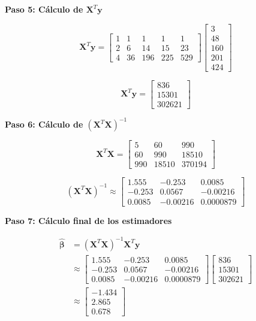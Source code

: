 \documentclass[11pt,a4paper]{article}
\begin{document}
\textbf{Paso 5: Cálculo de $\mathbf{X}^T\mathbf{y}$}

\[
\mathbf{X}^T\mathbf{y} = \begin{bmatrix}
    1 & 1 & 1 & 1 & 1 \\
    2 & 6 & 14 & 15 & 23 \\
    4 & 36 & 196 & 225 & 529
\end{bmatrix}
\begin{bmatrix}
    3 \\
    48 \\
    160 \\
    201 \\
    424
\end{bmatrix}
\]

\[
\mathbf{X}^T\mathbf{y} = \begin{bmatrix} 836 \\ 15301 \\ 302621 \end{bmatrix}
\]

\textbf{Paso 6: Cálculo de $(\mathbf{X}^T\mathbf{X})^{-1}$}

\[
\mathbf{X}^T\mathbf{X} = \begin{bmatrix} 5 & 60 & 990 \\ 60 & 990 & 18510 \\ 990 & 18510 & 370194 \end{bmatrix}
\]

\[
(\mathbf{X}^T\mathbf{X})^{-1} \approx \begin{bmatrix}
1.555 & -0.253 & 0.0085 \\
-0.253 & 0.0567 & -0.00216 \\
0.0085 & -0.00216 & 0.0000879
\end{bmatrix}
\]

\textbf{Paso 7: Cálculo final de los estimadores}

\begin{align*}
\hat{\boldsymbol{\beta}} &= (\mathbf{X}^T\mathbf{X})^{-1}\mathbf{X}^T\mathbf{y} \\
&\approx \begin{bmatrix} 1.555 & -0.253 & 0.0085 \\ -0.253 & 0.0567 & -0.00216 \\ 0.0085 & -0.00216 & 0.0000879 \end{bmatrix} \begin{bmatrix} 836 \\ 15301 \\ 302621 \end{bmatrix} \\
&\approx \begin{bmatrix} -1.434 \\ 2.865 \\ 0.678 \end{bmatrix}
\end{align*}
\end{document}
